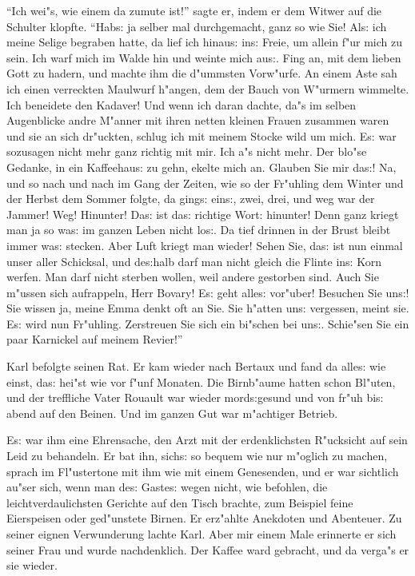 \documentclass[oneside,12pt]{book}
\newcommand{\s}{s:}%
\begin{document}
"`Ich wei"s, wie einem da zumute ist!"' sagte er, indem er dem
Witwer auf die Schulter klopfte. "`Hab{\s} ja selber mal
durchgemacht, ganz so wie Sie! Al{\s} ich meine Selige begraben
hatte, da lief ich hinau{\s} in{\s} Freie, um allein f"ur mich zu
sein. Ich warf mich im Walde hin und weinte mich au{\s}. Fing an,
mit dem lieben Gott zu hadern, und machte ihm die d"ummsten
Vorw"urfe. An einem Aste sah ich einen verreckten Maulwurf
h"angen, dem der Bauch von W"urmern wimmelte. Ich beneidete den
Kadaver! Und wenn ich daran dachte, da"s im selben Augenblicke
andre M"anner mit ihren netten kleinen Frauen zusammen waren und
sie an sich dr"uckten, schlug ich mit meinem Stocke wild um mich.
E{\s} war sozusagen nicht mehr ganz richtig mit mir. Ich a"s nicht
mehr. Der blo"se Gedanke, in ein Kaffeehau{\s} zu gehn, ekelte
mich an. Glauben Sie mir da{\s}! Na, und so nach und nach im Gang
der Zeiten, wie so der Fr"uhling dem Winter und der Herbst dem
Sommer folgte, da ging{\s} ein{\s}, zwei, drei, und weg war der
Jammer! Weg! Hinunter! Da{\s} ist da{\s} richtige Wort: hinunter!
Denn ganz kriegt man ja so wa{\s} im ganzen Leben nicht lo{\s}. Da
tief drinnen in der Brust bleibt immer wa{\s} stecken. Aber Luft
kriegt man wieder! Sehen Sie, da{\s} ist nun einmal unser aller
Schicksal, und de{\s}halb darf man nicht gleich die Flinte in{\s}
Korn werfen. Man darf nicht sterben wollen, weil andere gestorben
sind. Auch Sie m"ussen sich aufrappeln, Herr Bovary! E{\s} geht
alle{\s} vor"uber! Besuchen Sie un{\s}! Sie wissen ja, meine Emma
denkt oft an Sie. Sie h"atten un{\s} vergessen, meint sie. E{\s}
wird nun Fr"uhling. Zerstreuen Sie sich ein bi"schen bei un{\s}.
Schie"sen Sie ein paar Karnickel auf meinem Revier!"'

Karl befolgte seinen Rat. Er kam wieder nach Bertaux und fand da
alle{\s} wie einst, da{\s} hei"st wie vor f"unf Monaten. Die
Birnb"aume hatten schon Bl"uten, und der treffliche Vater Rouault
war wieder mord{\s}gesund und von fr"uh bi{\s} abend auf den
Beinen. Und im ganzen Gut war m"achtiger Betrieb.

E{\s} war ihm eine Ehrensache, den Arzt mit der erdenklichsten
R"ucksicht auf sein Leid zu behandeln. Er bat ihn, sich{\s} so
bequem wie nur m"oglich zu machen, sprach im Fl"ustertone mit ihm
wie mit einem Genesenden, und er war sichtlich au"ser sich, wenn
man de{\s} Gaste{\s} wegen nicht, wie befohlen, die
leichtverdaulichsten Gerichte auf den Tisch brachte, zum Beispiel
feine Eierspeisen oder ged"unstete Birnen. Er erz"ahlte Anekdoten
und Abenteuer. Zu seiner eignen Verwunderung lachte Karl. Aber mir
einem Male erinnerte er sich seiner Frau und wurde nachdenklich.
Der Kaffee ward gebracht, und da verga"s er sie wieder.
\end{document}

